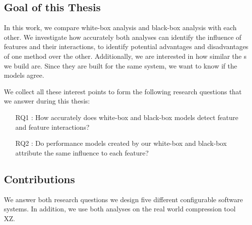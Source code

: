 \subsection{Goal of this Thesis}
In this work, we compare white-box analysis and black-box analysis with each other. 
We investigate how accurately both analyses can identify the influence of features and their interactions,
 to identify potential advantages and disadvantages of one method over the other. 
 Additionally, we are interested in how similar the {\perfInfluenceModel}s we build are. 
 Since they are built for the same system, we want to know if the models agree.

We collect all these interest points to form the following research questions that we answer during this thesis: 

\begin{itemize}\label{researchQuestions}
    \item[RQ1]: How accurately does white-box and black-box models detect feature and feature interactions? 
    \item[RQ2]: Do performance models created by our white-box and black-box attribute the same influence to each feature?
\end{itemize}

\subsection{Contributions}
We answer both research questions we design five different configurable software systems. 
In addition, we use both analyses on the real world compression tool \textsc{XZ}.